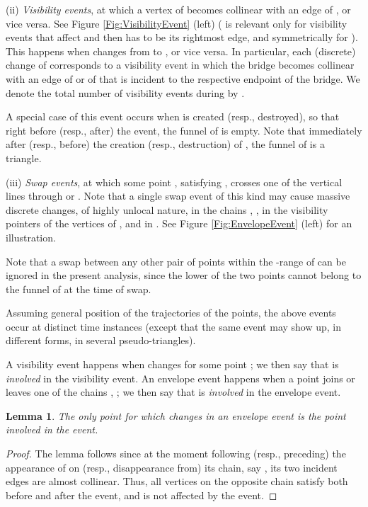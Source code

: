 \documentclass[11pt]{article}
\newtheorem{lemma}[theorem]{Lemma}
\begin{document}
(ii) \textit{Visibility events}, at which a vertex  of  becomes collinear with an edge  of , or vice versa. See Figure \ref{Fig:VisibilityEvent} (left) ( is relevant only for visibility events that affect  and then  has to be its rightmost edge, and symmetrically for ).
This happens when  changes from  to , or vice versa. In particular, each (discrete) change of  corresponds to a visibility event in which the bridge becomes collinear with an edge of  or of  that is incident to the respective endpoint of the bridge. We denote the total number of visibility events during  by . 

A special case of this event occurs when  is created (resp., destroyed), so that right before (resp., after) the event, the funnel of  is empty. Note that immediately after (resp., before) the creation (resp., destruction) of , the funnel of  is a triangle.

(iii) \textit{Swap events}, at which some point , satisfying
, crosses one of the vertical lines
through  or . Note that a
single swap event of this kind may cause massive discrete changes, of
highly unlocal nature, in the chains , , in the visibility
pointers  of the vertices of , and in .
See Figure \ref{Fig:EnvelopeEvent} (left) for an illustration.

Note that a swap between any other pair of points  within the -range of  can be ignored in the present analysis, since the lower of the two points cannot belong to the funnel of  at the time of swap.

Assuming general position of the trajectories of the points,
the above events occur at distinct time instances (except that the same event may show up, in different forms, in several pseudo-triangles).

A visibility event happens when  changes for some point ;
we then say that  is {\em involved } in the visibility event.
An envelope event happens when a point  joins or leaves one
of the chains , ;
we then say that  is {\em involved } in the envelope event.

\begin{lemma}\label{Lemma:ingoingEnvelopeEvent}
The only point  for which  changes in an envelope event
is the point  involved in the event.
\end{lemma}

\begin{proof}
 The lemma follows since at
  the moment following (resp., preceding) the appearance of  on
  (resp., disappearance from) its chain, say , its
  two incident edges are almost collinear. Thus, all vertices  on
  the opposite chain satisfy  both before and
  after the event, and  is not affected by the event.
\end{proof}
\end{document}
